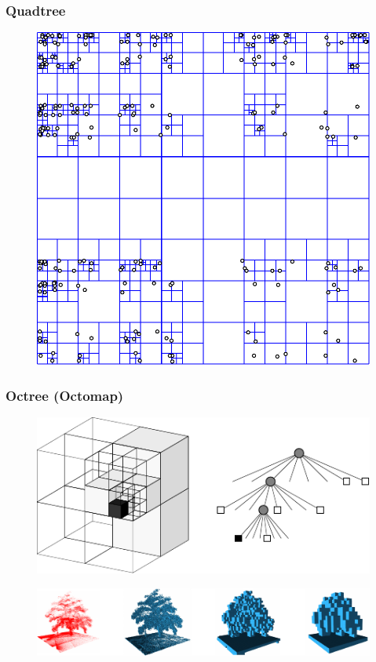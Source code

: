 \begin{frame}
    \frametitle{Quadtree}
    
    
    \begin{figure}
    	\includegraphics[width=0.5\columnwidth]{./images/quadtree.pdf}
    \end{figure}
    
\end{frame}

\begin{frame}
	\frametitle{Octree (Octomap)}

	\begin{figure}
		\includegraphics[width=0.5\columnwidth]{./images/octree.pdf}
	\end{figure}
	
	\begin{figure}
		\includegraphics[width=\columnwidth]{./images/octomap.pdf}
	\end{figure}
	
\end{frame}

